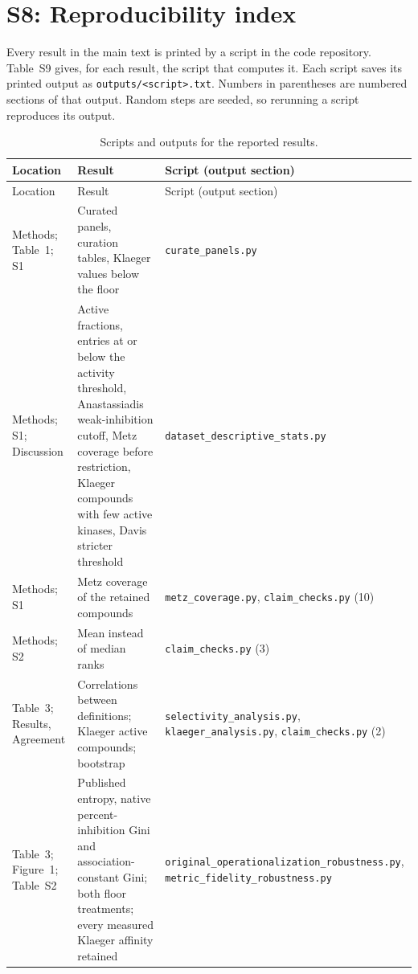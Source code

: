 \documentclass[11pt]{article}
\begin{document}
\clearpage
\section*{S8: Reproducibility index}

Every result in the main text is printed by a script in the code repository.
Table~S9 gives, for each result, the script that computes it. Each script
saves its printed output as \texttt{outputs/\allowbreak <script>.txt}. Numbers
in parentheses are numbered sections of that output. Random steps are seeded,
so rerunning a script reproduces its output.

\small
\begin{longtable}{>{\raggedright\arraybackslash}p{}>{\raggedright\arraybackslash}p{}>{\raggedright\arraybackslash}p{}}
\caption{Scripts and outputs for the reported results.}\\
\toprule
Location & Result & Script (output section) \\
\midrule
\endfirsthead
\toprule
Location & Result & Script (output section) \\
\midrule
\endhead
\bottomrule
\endfoot
Methods; Table~1; S1 & Curated panels, curation tables, Klaeger values below the floor & \texttt{curate\_\allowbreak{}panels.py} \\
Methods; S1; Discussion & Active fractions, entries at or below the activity threshold, Anastassiadis weak-inhibition cutoff, Metz coverage before restriction, Klaeger compounds with few active kinases, Davis stricter threshold & \texttt{dataset\_\allowbreak{}descriptive\_\allowbreak{}stats.py} \\
Methods; S1 & Metz coverage of the retained compounds & \texttt{metz\_\allowbreak{}coverage.py}, \texttt{claim\_\allowbreak{}checks.py} (10) \\
Methods; S2 & Mean instead of median ranks & \texttt{claim\_\allowbreak{}checks.py} (3) \\
Table~3; Results, Agreement & Correlations between definitions; Klaeger active compounds; bootstrap & \texttt{selectivity\_\allowbreak{}analysis.py}, \texttt{klaeger\_\allowbreak{}analysis.py}, \texttt{claim\_\allowbreak{}checks.py} (2) \\
Table~3; Figure~1; Table~S2 & Published entropy, native percent-inhibition Gini and association-constant Gini; both floor treatments; every measured Klaeger affinity retained & \texttt{original\_\allowbreak{}operationalization\_\allowbreak{}robustness.py}, \texttt{metric\_\allowbreak{}fidelity\_\allowbreak{}robustness.py} \\

\end{longtable}
\end{document}
